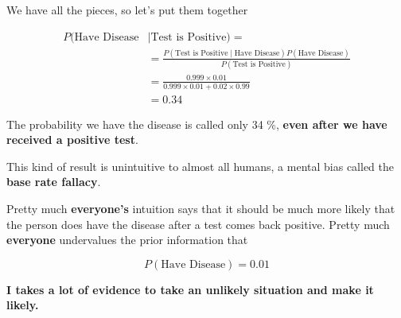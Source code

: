 \begin{frame}

We have all the pieces, so let's put them together

\begin{align*}
P(\text{Have Disease}  & \mid \text{Test is Positive)} = \\
%
&= \frac{  P(\text{Test is
Positive} \mid \text{Have Disease}) P(\text{Have Disease}) } { P(\text{Test is
Positive}) } \\
%
&= \frac{ 0.999 \times 0.01 } {  0.999 \times 0.01 +  0.02 \times 0.99 } \\
%
&= 0.34
\end{align*}

The probability we have the disease is called only 34 \%, \textbf{even after we
have received a positive test}.

\end{frame}
%

%
\begin{frame}

This kind of result is unintuitive to almost all humans, a mental bias called the
\textbf{base rate fallacy}.

Pretty much \textbf{everyone's} intuition says that it should be much more
likely that the person does have the disease after a test comes back positive.
Pretty much \textbf{everyone} undervalues the prior information that

$$ P(\text{Have Disease}) = 0.01 $$

\textbf{I takes a lot of evidence to take an unlikely situation and make it
likely.}

\end{frame}
